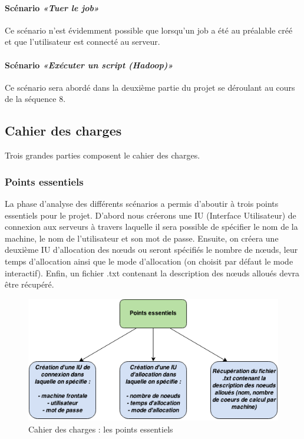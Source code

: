 \paragraph{Scénario \emph{«Tuer le job»}}
\label{sec:scenario-tuer-le}
\par Ce scénario n’est évidemment possible que lorsqu’un job a été au préalable créé et que l’utilisateur est connecté au serveur. 

\paragraph{Scénario \emph{«Exécuter un script (Hadoop)»}}
\label{sec:scenario-executer-un}
\par Ce scénario sera abordé dans la deuxième partie du projet se déroulant au cours de la séquence 8.


\subsection{Cahier des charges}
\label{sec:cahier-des-charges}

\par Trois grandes parties composent le cahier des charges.

\subsubsection{Points essentiels}
\label{sec:points-essentiels}

\par La phase d'analyse des différents scénarios a permis d'aboutir à trois points essentiels pour le projet. D’abord nous créerons une IU (Interface Utilisateur) de connexion aux serveurs à travers laquelle il sera possible de spécifier le nom de la machine, le nom de l'utilisateur et son mot de passe.
Ensuite, on créera une deuxième IU d’allocation des nœuds ou seront spécifiés le nombre de nœuds, leur temps d’allocation ainsi que le mode d’allocation (on choisit par défaut le mode interactif).
Enfin, un fichier .txt contenant la description des nœuds alloués devra être récupéré.

\begin{figure}[h!]
  \centering
  \includegraphics[width=12cm]{images/points_essentiels.png}
  \caption{Cahier des charges : les points essentiels}
  \label{fig:pts_essentiels}
\end{figure}


